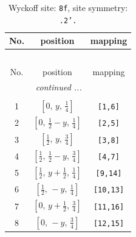 \documentclass[fleqn,8pt]{jsarticle}
\begin{document}
\begin{longtable}{ccc}
\caption{Wyckoff site: {\tt 8f}, site symmetry: {\tt .2'.}}
 \\
 \hline \hline
No. & position & mapping \\ \hline \endfirsthead

\multicolumn{2}{l}{\tablename\ \thetable{}} \\
 \hline \hline
No. & position & mapping \\ \hline \endhead

 \hline \hline
\multicolumn{2}{r}{\footnotesize\it continued ...} \\ \endfoot

 \hline \hline
\multicolumn{2}{r}{} \\ \endlastfoot

1 & $\left[ 0,\, y,\, \frac{1}{4} \right]$ & {\tt [1,6]} \\ \hline
2 & $\left[ 0,\, \frac{1}{2} - y,\, \frac{1}{4} \right]$ & {\tt [2,5]} \\ \hline
3 & $\left[ \frac{1}{2},\, y,\, \frac{3}{4} \right]$ & {\tt [3,8]} \\ \hline
4 & $\left[ \frac{1}{2},\, \frac{1}{2} - y,\, \frac{3}{4} \right]$ & {\tt [4,7]} \\ \hline
5 & $\left[ \frac{1}{2},\, y + \frac{1}{2},\, \frac{1}{4} \right]$ & {\tt [9,14]} \\ \hline
6 & $\left[ \frac{1}{2},\, - y,\, \frac{1}{4} \right]$ & {\tt [10,13]} \\ \hline
7 & $\left[ 0,\, y + \frac{1}{2},\, \frac{3}{4} \right]$ & {\tt [11,16]} \\ \hline
8 & $\left[ 0,\, - y,\, \frac{3}{4} \right]$ & {\tt [12,15]} \\
\end{longtable}
\renewcommand{\arraystretch}{1.2}
\end{document}
